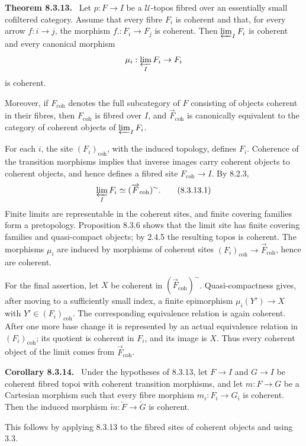 \documentclass[11pt]{article}
\newcommand{\U}{\mathcal{U}}
\newcommand{\coh}{\mathrm{coh}}
\newenvironment{statement}[1]{\par\medskip\noindent\textbf{#1.}\ }{\par\medskip}
\begin{document}
\begin{statement}{Theorem 8.3.13}
Let \(p:F\to I\) be a \(\U\)-topos fibred over an essentially small cofiltered category. Assume that every fibre \(F_i\) is coherent and that, for every arrow \(f:i\to j\), the morphism \(f.:F_i\to F_j\) is coherent. Then \(\varprojlim_I F_i\) is coherent and every canonical morphism
\[
 \mu_i:\varprojlim_I F_i\to F_i
\]
is coherent.

Moreover, if \(F_{\coh}\) denotes the full subcategory of \(F\) consisting of objects coherent in their fibres, then \(F_{\coh}\) is fibred over \(I\), and \(\overrightarrow{F}_{\coh}\) is canonically equivalent to the category of coherent objects of \(\varprojlim_I F_i\).
\end{statement}
For each \(i\), the site \((F_i)_{\coh}\), with the induced topology, defines \(F_i\). Coherence of the transition morphisms implies that inverse images carry coherent objects to coherent objects, and hence defines a fibred site \(F_{\coh}\to I\). By 8.2.3,
\[
 \varprojlim_I F_i\simeq (\overrightarrow{F}_{\coh})^\sim. \tag{8.3.13.1}
\]
Finite limits are representable in the coherent sites, and finite covering families form a pretopology. Proposition 8.3.6 shows that the limit site has finite covering families and quasi-compact objects; by 2.4.5 the resulting topos is coherent. The morphisms \(\mu_i\) are induced by morphisms of coherent sites \((F_i)_{\coh}\to\overrightarrow{F}_{\coh}\), hence are coherent.

For the final assertion, let \(X\) be coherent in \((\overrightarrow{F}_{\coh})^\sim\). Quasi-compactness gives, after moving to a sufficiently small index, a finite epimorphism \(\mu_i(Y')\to X\) with \(Y'\in(F_i)_{\coh}\). The corresponding equivalence relation is again coherent. After one more base change it is represented by an actual equivalence relation in \((F_i)_{\coh}\); its quotient is coherent in \(F_i\), and its image is \(X\). Thus every coherent object of the limit comes from \(\overrightarrow{F}_{\coh}\).

\begin{statement}{Corollary 8.3.14}
Under the hypotheses of 8.3.13, let \(F\to I\) and \(G\to I\) be coherent fibred topoi with coherent transition morphisms, and let \(m:F\to G\) be a Cartesian morphism such that every fibre morphism \(m_i:F_i\to G_i\) is coherent. Then the induced morphism \(\overleftarrow m:\overleftarrow F\to\overleftarrow G\) is coherent.
\end{statement}
This follows by applying 8.3.13 to the fibred sites of coherent objects and using 3.3.
\end{document}
